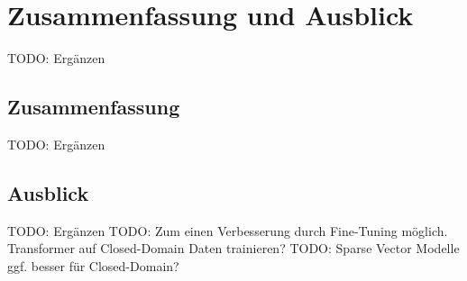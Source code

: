 \chapter{Zusammenfassung und Ausblick}
TODO: Ergänzen

\section{Zusammenfassung}
TODO: Ergänzen

\section{Ausblick}
TODO: Ergänzen
TODO: Zum einen Verbesserung durch Fine-Tuning möglich. Transformer auf Closed-Domain Daten trainieren?
TODO: Sparse Vector Modelle ggf. besser für Closed-Domain? 
